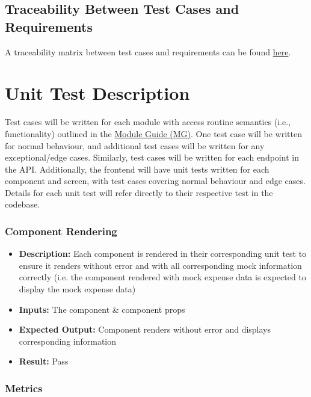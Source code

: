 \documentclass[12pt, titlepage]{article}
\begin{document}
\subsection{Traceability Between Test Cases and Requirements}

A traceability matrix between test cases and requirements can be found
\href{https://github.com/PlutosCapstone/Plutos/blob/main/docs/VnVPlan/traceability_tests_and_requirements.xlsx}{here}.

\newpage

\section{Unit Test Description}

Test cases will be written for each module with access routine semantics (i.e.,
functionality) outlined in the
\href{https://github.com/PlutosCapstone/Plutos/blob/main/docs/Design/SoftArchitecture/MG.pdf}{Module
Guide (MG)}. One test case will be written for normal behaviour, and additional
test cases will be written for any exceptional/edge cases. Similarly, test cases
will be written for each endpoint in the API. Additionally, the frontend will
have unit tests written for each component and screen, with test cases covering
normal behaviour and edge cases.\\
Details for each unit test will refer directly to their respective test in the
codebase.\\

\subsubsection{Component Rendering}

\begin{itemize}
  \item \textbf{Description:} Each component is rendered in their corresponding unit test to ensure it renders without error and with all corresponding mock information correctly
  (i.e. the component rendered with mock expense data is expected to display the mock expense data)
  \item \textbf{Inputs:} The component \& component props
  \item \textbf{Expected Output:} Component renders without error and displays corresponding information
  \item \textbf{Result:} Pass
\end{itemize}

\subsubsection{Metrics}
\end{document}
